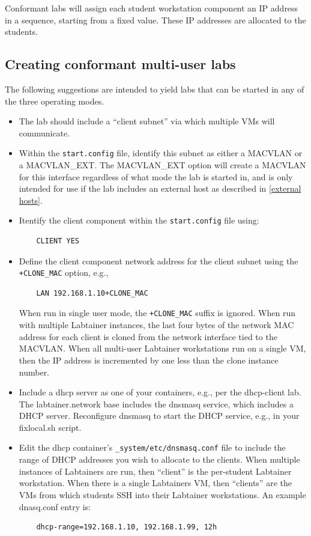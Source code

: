 \documentclass[12pt]{article}
\begin{document}
Conformant labs will assign each student workstation component an IP address in a sequence,
starting from a fixed value.  These IP addresses are allocated to the students.

\subsection{Creating conformant multi-user labs}
\label{conformant multi-user}
The following suggestions are intended to yield labs that can be started in any of
the three operating modes.

\begin{itemize}
\item The lab should include a ``client subnet'' via which multiple VMs will communicate.

\item Within the {\tt start.config} file, identify this subnet as either a MACVLAN or
a MACVLAN\_EXT.  The MACVLAN\_EXT
option will create a MACVLAN for this interface regardless of what mode the lab is started in,
and is only intended for use if the lab includes an external host as described in \ref{external hosts}.

\item Itentify the client component within the {\tt start.config} file using:
\begin{verbatim}
    CLIENT YES
\end{verbatim}

\item Define the client component network address for the client subnet using the
{\tt +CLONE\_MAC} option, e.g., 
\begin{verbatim}
    LAN 192.168.1.10+CLONE_MAC
\end{verbatim}
\noindent  When run in single user mode, the {\tt +CLONE\_MAC} suffix is ignored.  When run
with multiple Labtainer instances, the last four bytes of the network MAC address for
each client is cloned from the network interface tied to the MACVLAN.  When all multi-user
Labtainer workstations run on a single VM, then the IP address is incremented by one less
than the clone instance number.

\item Include a dhcp server as one of your containers, e.g., per the dhcp-client lab.  
The labtainer.network base includes the dnsmasq service, which includes a DHCP
server.  Reconfigure dnsmasq to start the DHCP service, e.g., in your fixlocal.sh script.
\item Edit the dhcp container's {\tt \_system/etc/dnsmasq.conf} file to include the
range of DHCP addresses you wish to allocate to the clients.  When multiple instances
of Labtainers are run, then ``client'' is the per-student Labtainer workstation.  When
there is a single Labtainers VM, then ``clients'' are the VMs from which students
SSH into their Labtainer workstations.  An example dnasq.conf entry is:
\begin{verbatim}
    dhcp-range=192.168.1.10, 192.168.1.99, 12h
\end{verbatim}



\end{itemize}
\end{document}
